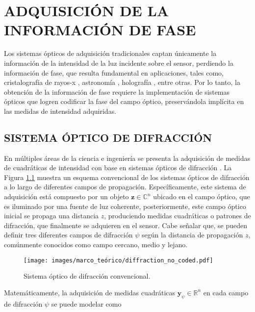 \chapter{ADQUISICIÓN DE LA INFORMACIÓN DE FASE}

Los sistemas ópticos de adquisición tradicionales captan únicamente la información de la intensidad de la luz incidente sobre el sensor, perdiendo la información de fase, que resulta fundamental en aplicaciones, tales como, cristalografía de rayos-x , astronomía , holografía , entre otras. Por lo tanto, la obtención de la información de fase requiere la implementación  de sistemas ópticos que logren codificar la fase del campo óptico, preservándola implícita en las medidas de intensidad adquiridas. 
    
\section{SISTEMA ÓPTICO DE DIFRACCIÓN}
En múltiples áreas de la ciencia e ingeniería se presenta la adquisición de medidas de cuadráticas de intensidad con base en sistemas ópticos de difracción . La Figura \ref{fig:difraction_systems} muestra un esquema convencional de los sistemas ópticos de difracción a lo largo de diferentes campos de propagación. Específicamente, este sistema de adquisición está compuesto por un objeto $\mathbf{z}\in\mathbb{C}^{n}$ ubicado en el campo óptico, que es iluminado por una fuente de luz coherente, posteriormente, este campo óptico inicial se propaga una distancia $z$, produciendo medidas cuadráticas o patrones de difracción, que finalmente se adquieren en el sensor. Cabe señalar que, se pueden definir tres diferentes campos de difracción $\psi$ según la distancia de propagación $z$, comúnmente conocidos como campo cercano, medio y lejano.

\begin{figure}[!h]
    \centering
    \caption{\hspace{2mm}Sistema óptico de difracción convencional.}
    \texttt{[image: images/marco\_teórico/diffraction\_no\_coded.pdf]}
    \label{fig:difraction_systems}
\end{figure}

Matemáticamente, la adquisición de medidas cuadráticas $\mathbf{y}_{\psi}\in\mathbb{R}^n$ en cada campo de difracción $\psi$ se puede modelar como 

